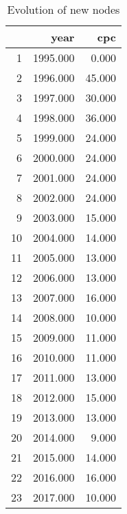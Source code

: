 \begin{table}[ht]
\centering
\begin{tabular}{rrr}
  \hline
 & year & cpc \\ 
  \hline
1 & 1995.000 & 0.000 \\ 
  2 & 1996.000 & 45.000 \\ 
  3 & 1997.000 & 30.000 \\ 
  4 & 1998.000 & 36.000 \\ 
  5 & 1999.000 & 24.000 \\ 
  6 & 2000.000 & 24.000 \\ 
  7 & 2001.000 & 24.000 \\ 
  8 & 2002.000 & 24.000 \\ 
  9 & 2003.000 & 15.000 \\ 
  10 & 2004.000 & 14.000 \\ 
  11 & 2005.000 & 13.000 \\ 
  12 & 2006.000 & 13.000 \\ 
  13 & 2007.000 & 16.000 \\ 
  14 & 2008.000 & 10.000 \\ 
  15 & 2009.000 & 11.000 \\ 
  16 & 2010.000 & 11.000 \\ 
  17 & 2011.000 & 13.000 \\ 
  18 & 2012.000 & 15.000 \\ 
  19 & 2013.000 & 13.000 \\ 
  20 & 2014.000 & 9.000 \\ 
  21 & 2015.000 & 14.000 \\ 
  22 & 2016.000 & 16.000 \\ 
  23 & 2017.000 & 10.000 \\ 
   \hline
\end{tabular}
\caption{Evolution of new nodes} 
\end{table}
